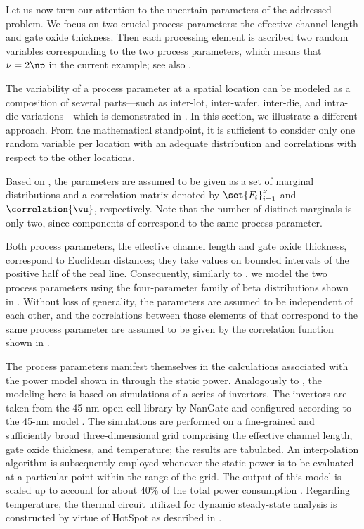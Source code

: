 Let us now turn our attention to the uncertain parameters \vu of the addressed
problem. We focus on two crucial process parameters: the effective channel
length and gate oxide thickness. Then each processing element is ascribed two
random variables corresponding to the two process parameters, which means that
$\nu = 2 \np$ in the current example; see also .

\begin{remark}
The variability of a process parameter at a spatial location can be modeled as a
composition of several parts---such as inter-lot, inter-wafer, inter-die, and
intra-die variations---which is demonstrated in
. In this section, we illustrate a different
approach. From the mathematical standpoint, it is sufficient to consider only
one random variable per location with an adequate distribution and correlations
with respect to the other locations.
\end{remark}

Based on , the parameters \vu are assumed to be given as
a set of marginal distributions and a correlation matrix denoted by
$\set{F_i}_{i = 1}^\nu$ and $\correlation{\vu}$, respectively. Note that the
number of distinct marginals is only two, since \np components of \vu correspond
to the same process parameter.

Both process parameters, the effective channel length and gate oxide thickness,
correspond to Euclidean distances; they take values on bounded intervals of the
positive half of the real line. Consequently, similarly to
, we model the two process parameters using
the four-parameter family of beta distributions shown in
. Without loss of generality, the parameters are assumed
to be independent of each other, and the correlations between those elements of
\vu that correspond to the same process parameter are assumed to be given by the
correlation function shown in .

The process parameters manifest themselves in the calculations associated with
the power model shown in  through the static power.
Analogously to , the modeling here is based on
 simulations of a series of  invertors. The invertors are
taken from the 45-nm open cell library by NanGate \cite{nangate} and configured
according to the 45-nm   model \cite{ptm}. The simulations are
performed on a fine-grained and sufficiently broad three-dimensional grid
comprising the effective channel length, gate oxide thickness, and temperature;
the results are tabulated. An interpolation algorithm is subsequently employed
whenever the static power is to be evaluated at a particular point within the
range of the grid. The output of this model is scaled up to account for about
40\% of the total power consumption \cite{liu2007}. Regarding temperature, the
thermal  circuit utilized for dynamic steady-state analysis is
constructed by virtue of HotSpot \cite{skadron2003} as described in
.

